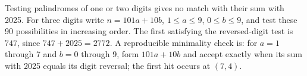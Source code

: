 Testing palindromes of one or two digits gives no match with their sum with 2025. For three digits write $n=101a+10b$, $1\le a\le9$, $0\le b\le9$, and test these 90 possibilities in increasing order. The first satisfying the reversed-digit test is $\boxed{747}$, since $747+2025=2772$. A reproducible minimality check is: for $a=1$ through 7 and $b=0$ through 9, form $101a+10b$ and accept exactly when its sum with 2025 equals its digit reversal; the first hit occurs at $(7,4)$.
